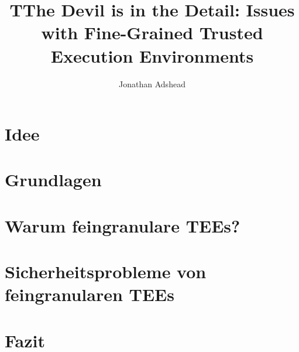 \documentclass[sigconf]{acmart}
\title{TThe Devil is in the Detail: Issues with Fine-Grained Trusted Execution Environments}
\author{Jonathan Adshead}
\affiliation{
    \institution{Friedricht-Alexander-Universität Erlangen-Nürnberg}
    \country{}}
\begin{document}
\maketitle  %

\thispagestyle{plain} %
\pagestyle{plain} %



\section{Idee}


\section{Grundlagen}


\section{Warum feingranulare TEEs?}


\section{Sicherheitsprobleme von feingranularen TEEs}


\section{Fazit}



\end{document}
